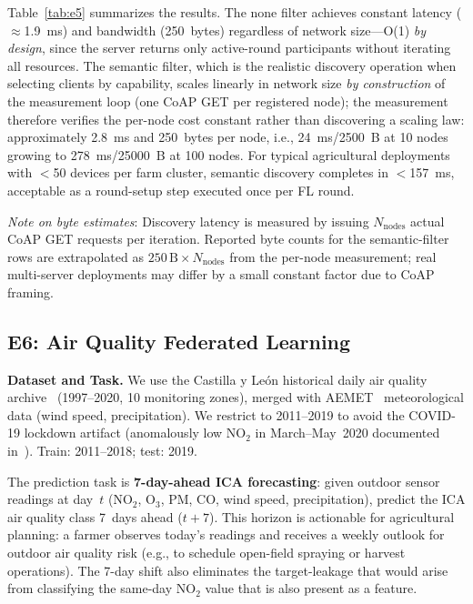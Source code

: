 \documentclass[a4paper,fleqn]{cas-dc}
\begin{document}
Table~\ref{tab:e5} summarizes the results. The none filter achieves constant latency ($\approx$1.9~ms) and bandwidth (250~bytes) regardless of network size---O(1) \emph{by design}, since the server returns only active-round participants without iterating all resources. The semantic filter, which is the realistic discovery operation when selecting clients by capability, scales linearly in network size \emph{by construction} of the measurement loop (one CoAP GET per registered node); the measurement therefore verifies the per-node cost constant rather than discovering a scaling law: approximately 2.8~ms and 250~bytes per node, i.e., 24~ms/2500~B at 10 nodes growing to 278~ms/25000~B at 100 nodes. For typical agricultural deployments with $<$50 devices per farm cluster, semantic discovery completes in $<$157~ms, acceptable as a round-setup step executed once per FL round.

\emph{Note on byte estimates}: Discovery latency is measured by issuing $N_\text{nodes}$ actual CoAP GET requests per iteration. Reported byte counts for the semantic-filter rows are extrapolated as $250\,\text{B} \times N_\text{nodes}$ from the per-node measurement; real multi-server deployments may differ by a small constant factor due to CoAP framing.

\subsection{E6: Air Quality Federated Learning}
\label{sec:e6}

\textbf{Dataset and Task.} We use the Castilla y Le\'on historical daily air quality archive~\cite{cyl2023airquality} (1997--2020, 10 monitoring zones), merged with AEMET~\cite{aemet2023} meteorological data (wind speed, precipitation). We restrict to 2011--2019 to avoid the COVID-19 lockdown artifact (anomalously low NO$_2$ in March--May~2020 documented in~\cite{lopezblanco2024airquality}). Train: 2011--2018; test: 2019.

The prediction task is \textbf{7-day-ahead ICA forecasting}: given outdoor sensor readings at day~$t$ (NO$_2$, O$_3$, PM, CO, wind speed, precipitation), predict the ICA air quality class 7~days ahead ($t{+}7$). This horizon is actionable for agricultural planning: a farmer observes today's readings and receives a weekly outlook for outdoor air quality risk (e.g., to schedule open-field spraying or harvest operations). The 7-day shift also eliminates the target-leakage that would arise from classifying the same-day NO$_2$ value that is also present as a feature.
\end{document}

